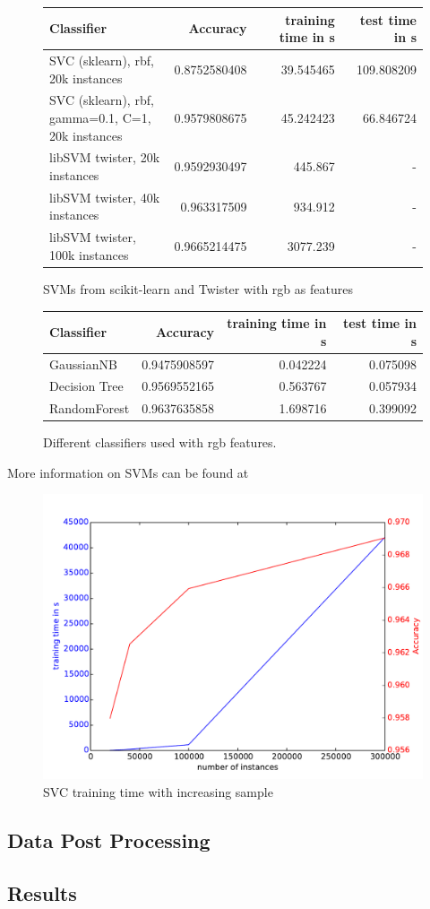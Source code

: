 \begin{figure}
\begin{tabular}{|l|r|r|r|}
\hline 	
Classifier 	& Accuracy & training time in s & test time in s \\  	
\hline 	
\hline 	
SVC (sklearn), rbf, 20k instances 	& 0.8752580408 	& 39.545465 	& 109.808209 	\\
\hline 	
\parbox[t]{6cm}{SVC (sklearn), rbf,\\ gamma=0.1, C=1, 20k instances} 	& 0.9579808675 	& 45.242423 	& 66.846724 \\  	
\hline 	
libSVM twister, 20k instances 	& 0.9592930497 	& 445.867 	& - \\  	
\hline 	
libSVM twister, 40k instances 	& 0.963317509 	& 934.912 	& - \\  	
\hline 	
libSVM twister, 100k instances 	& 0.9665214475 	& 3077.239 	& -\\ 	
\hline 
\end{tabular}  
\caption{SVMs from scikit-learn and Twister with rgb as features } 
\label{svm_table} 
\end{figure}

\begin{figure}
\begin{tabular}{|l|r|r|r|} 	
\hline 
Classifier & Accuracy & training time in s & test time in s \\  	
\hline 
GaussianNB & 0.9475908597 	& 0.042224 & 0.075098 \\  	
\hline 
Decision Tree & 0.9569552165 	& 0.563767 	& 0.057934 	\\  	
\hline 
RandomForest  & 0.9637635858 	& 1.698716 	& 0.399092 \\  	
\hline  
\end{tabular}  
\label{different_classifiers_table} 
\caption{Different classifiers used with rgb features.} 
\end{figure}

More information on SVMs can be found at \cite{Han2011}

\begin{figure} 
\centering 
\includegraphics[width=0.8\linewidth]{graphics/sklearn_runtime} 
\caption{SVC training time with increasing sample} 
\label{fig:sklearn_runtime} 
\end{figure}


\subsection{Data Post Processing}


\subsection{Results}


